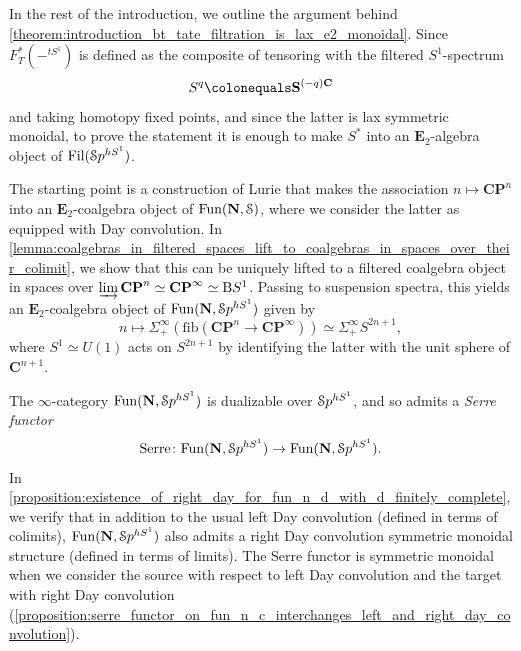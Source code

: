 \documentclass[oneside,a4paper]{amsart}
\begin{document}
In the rest of the introduction, we outline the argument behind \cref{theorem:introduction_bt_tate_filtration_is_lax_e2_monoidal}. Since $F_{T}^{\ast}(-^{tS^{1}})$ is defined as the composite of tensoring with the filtered $S^{1}$-spectrum 
\begin{equation}
\label{equation:introduction_filtered_e2_algebra_defining_the_bt_tate_filtration}
S^{q} \colonequals \thesphere^{(-q) \mathbf{C}}
\end{equation}
and taking homotopy fixed points, and since the latter is lax symmetric monoidal, to prove the statement it is enough to make $S^{\ast}$ into an $\mathbf{E}_{2}$-algebra object of $\operatorname{Fil}(\EuScript{S}p^{hS^{1}})$. 

The starting point is a construction of Lurie that makes the association $n \mapsto \mathbf{CP}^{n}$ into an $\mathbf{E}_{2}$-coalgebra object of $\mathrm{Fun}(\mathbf{N}, \EuScript{S})$, where we consider the latter as equipped with Day convolution. In \cref{lemma:coalgebras_in_filtered_spaces_lift_to_coalgebras_in_spaces_over_their_colimit}, we show that this can be uniquely lifted to a filtered coalgebra object in spaces over $\varinjlim \mathbf{CP}^{n} \simeq \mathbf{CP}^{\infty} \simeq \mathrm{B}S^{1}$. Passing to suspension spectra, this yields an $\mathbf{E}_{2}$-coalgebra object of $\mathrm{Fun}(\mathbf{N}, \EuScript{S}p^{hS^{1}})$ given by 
\begin{equation}
\label{equation:introduction_filtered_coalgebra_given_levelwise_by_odd_spheres}
n \mapsto \Sigma^{\infty}_{+}(\mathrm{fib}(\mathbf{CP}^{n} \rightarrow \mathbf{CP}^{\infty})) \simeq \Sigma^{\infty}_{+} S^{2n+1},
\end{equation}
where $S^{1} \simeq U(1)$ acts on $S^{2n+1}$ by identifying the latter with the unit sphere of $\mathbf{C}^{n+1}$. 

The $\infty$-category $\mathrm{Fun}(\mathbf{N}, \EuScript{S}p^{hS^{1}})$ is dualizable over $\EuScript{S}p^{hS^{1}}$, and so admits a \emph{Serre functor} 
\[
\mathrm{Serre} \colon \mathrm{Fun}(\mathbf{N}, \EuScript{S}p^{hS^{1}}) \rightarrow \mathrm{Fun}(\mathbf{N}, \EuScript{S}p^{hS^{1}}). 
\]
In \cref{proposition:existence_of_right_day_for_fun_n_d_with_d_finitely_complete}, we verify that in addition to the usual left Day convolution (defined in terms of colimits), $\mathrm{Fun}(\mathbf{N}, \EuScript{S}p^{hS^{1}})$ also admits a right Day convolution symmetric monoidal structure (defined in terms of limits). The Serre functor is symmetric monoidal when we consider the source with respect to left Day convolution and the target with right Day convolution (\cref{proposition:serre_functor_on_fun_n_c_interchanges_left_and_right_day_convolution}). 
\end{document}
